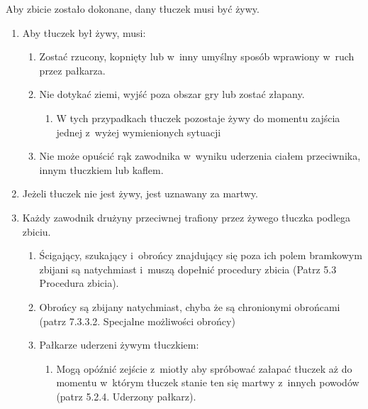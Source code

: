 \documentclass[12pt,a4paper]{article}
\begin{document}
Aby zbicie zostało dokonane, dany tłuczek musi być żywy.

\begin{enumerate}
	\item
	      Aby tłuczek był żywy, musi:

	      \begin{enumerate}
		      \item
		            Zostać rzucony, kopnięty lub w~inny umyślny sposób wprawiony w~ruch przez pałkarza.
		      \item
		            Nie dotykać ziemi, wyjść poza obszar gry lub zostać złapany.

		            \begin{enumerate}
			            \item
			                  W tych przypadkach tłuczek pozostaje żywy do momentu zajścia jednej z~wyżej
			                  wymienionych sytuacji
		            \end{enumerate}
		      \item
		            Nie może opuścić rąk zawodnika w~wyniku uderzenia ciałem
		            przeciwnika, innym tłuczkiem lub kaflem.
	      \end{enumerate}
	\item
	      Jeżeli tłuczek nie jest żywy, jest uznawany za martwy.
	\item
	      Każdy zawodnik drużyny przeciwnej trafiony przez żywego tłuczka
	      podlega zbiciu.

	      \begin{enumerate}
		      \item
		            Ścigający, szukający i~obrońcy znajdujący się poza ich polem
		            bramkowym zbijani są natychmiast i~muszą dopełnić procedury zbicia
		            (Patrz 5.3 Procedura zbicia).
		      \item
		            Obrońcy są zbijany natychmiast, chyba że są chronionymi obrońcami
		            (patrz 7.3.3.2. Specjalne możliwości obrońcy)
		      \item
		            Pałkarze uderzeni żywym tłuczkiem:

		            \begin{enumerate}
			            \item
			                  Mogą opóźnić zejście z~miotły aby spróbować załapać tłuczek aż do
			                  momentu w~którym tłuczek stanie ten się martwy z~innych powodów
			                  (patrz 5.2.4. Uderzony pałkarz).


\end{enumerate}
\end{enumerate}
\end{enumerate}
\end{document}
